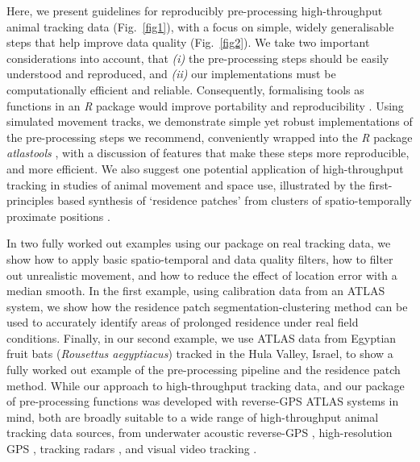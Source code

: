 \begin{refsection}[sorting=nyt]
    Here, we present guidelines for reproducibly pre-processing high-throughput animal tracking data (Fig.~\ref{fig1}), with a focus on simple, widely generalisable steps that help improve data quality (Fig.~\ref{fig2}).
    We take two important considerations into account, that \textit{(i)} the pre-processing steps should be easily understood and reproduced, and \textit{(ii)} our implementations must be computationally efficient and reliable.
    Consequently, formalising tools as functions in an \textit{R} package would improve portability and reproducibility \citep{marwick2018, wickham2015}.
    Using simulated movement tracks, we demonstrate simple yet robust implementations of the pre-processing steps we recommend, conveniently wrapped into the \textit{R} package \textit{atlastools} \citep{gupte2020a}, with a discussion of features that make these steps more reproducible, and more efficient.
    We also suggest one potential application of high-throughput tracking in studies of animal movement and space use, illustrated by the first-principles based synthesis of `residence patches' from clusters of spatio-temporally proximate positions \citep[\textit{sensu}][]{bijleveld2016, oudman2018, barraquand2008}.

    In two fully worked out examples using our package on real tracking data, we show how to apply basic spatio-temporal and data quality filters, how to filter out unrealistic movement, and how to reduce the effect of location error with a median smooth.
    In the first example, using calibration data from an ATLAS system, we show how the residence patch segmentation-clustering method can be used to accurately identify areas of prolonged residence under real field conditions.
    Finally, in our second example, we use ATLAS data from Egyptian fruit bats (\textit{Rousettus aegyptiacus}) tracked in the Hula Valley, Israel, to show a fully worked out example of the pre-processing pipeline and the residence patch method.
    While our approach to high-throughput tracking data, and our package of pre-processing functions was developed with reverse-GPS ATLAS systems in mind, both are broadly suitable to a wide range of high-throughput animal tracking data sources, from underwater acoustic reverse-GPS \citep{baktoft2019, baktoft2017, jung2015, aspillaga2021, aspillaga2021a}, high-resolution GPS \citep{strandburg-peshkin2015, papageorgiou2019, harel2016, klarevas-irby2021}, tracking radars \citep{horvitz2014}, and visual video tracking \citep{rathore2020, perez-escudero2014}.


\end{refsection}
